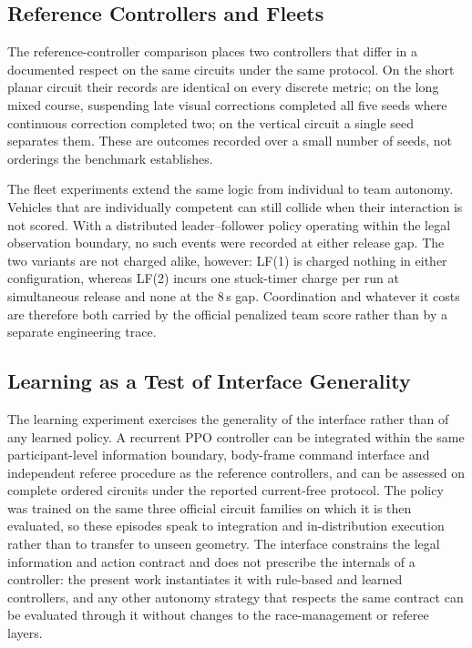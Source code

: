 \subsection{Reference Controllers and Fleets}

The reference-controller comparison places two controllers that differ in a
documented respect on the same circuits under the same protocol. On the short
planar circuit their records are identical on every discrete metric; on the long
mixed course, suspending late visual corrections completed all five seeds where
continuous correction completed two; on the vertical circuit a single seed
separates them. These are outcomes recorded over a small number of seeds, not
orderings the benchmark establishes.

The fleet experiments extend the same logic from individual to team autonomy.
Vehicles that are individually competent can still collide when their
interaction is not scored. With a distributed leader--follower policy operating
within the legal observation boundary, no such events were recorded at either
release gap. The two variants are not charged alike, however: LF(1) is charged
nothing in either configuration, whereas LF(2) incurs one stuck-timer charge per
run at simultaneous release and none at the $8$\,s gap. Coordination and
whatever it costs are therefore both carried by the official penalized team
score rather than by a separate engineering trace.

\subsection{Learning as a Test of Interface Generality}

The learning experiment exercises the generality of the interface rather than of
any learned policy. A recurrent PPO controller can be integrated within the same
participant-level information boundary, body-frame command interface and
independent referee procedure as the reference controllers, and can be assessed
on complete ordered circuits under the reported current-free protocol. The policy
was trained on the same three official circuit families on which it is then
evaluated, so these episodes speak to integration and in-distribution execution
rather than to transfer to unseen geometry. The interface constrains the legal information and
action contract and does not prescribe the internals of a controller: the present
work instantiates it with rule-based and learned controllers, and any other
autonomy strategy that respects the same contract can be evaluated through it
without changes to the race-management or referee layers.
